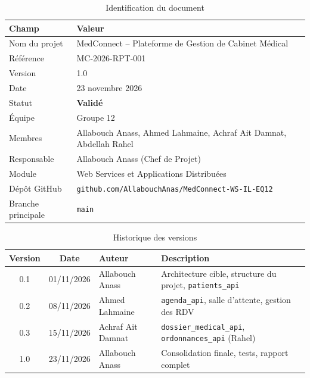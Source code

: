 \documentclass[12pt,a4paper]{report}
\begin{document}
\begin{table}[H]
\centering
\caption{Identification du document}
\begin{tabular}{|p{5cm}|p{9cm}|}
  \hline
  \rowcolor{medaccent}
  \textbf{Champ} & \textbf{Valeur} \\
  \hline
  Nom du projet & MedConnect -- Plateforme de Gestion de Cabinet Médical \\
  \hline
  Référence & MC-2026-RPT-001 \\
  \hline
  Version & 1.0 \\
  \hline
  Date & 23 novembre 2026 \\
  \hline
  Statut & \textcolor{medgreen}{\textbf{Validé}} \\
  \hline
  Équipe & Groupe 12 \\
  \hline
  Membres & Allabouch Anass, Ahmed Lahmaine, Achraf Ait Damnat, Abdellah Rahel \\
  \hline
  Responsable & Allabouch Anass (Chef de Projet) \\
  \hline
  Module & Web Services et Applications Distribuées \\
  \hline
  Dépôt GitHub & \texttt{github.com/AllabouchAnas/MedConnect-WS-IL-EQ12} \\
  \hline
  Branche principale & \texttt{main} \\
  \hline
\end{tabular}
\end{table}

\vspace{0.5cm}

\begin{table}[H]
\centering
\caption{Historique des versions}
\begin{tabular}{|c|c|p{3cm}|p{6cm}|}
  \hline
  \rowcolor{medaccent}
  \textbf{Version} & \textbf{Date} & \textbf{Auteur} & \textbf{Description} \\
  \hline
  0.1 & 01/11/2026 & Allabouch Anass & Architecture cible, structure du projet, \texttt{patients\_api} \\
  \hline
  0.2 & 08/11/2026 & Ahmed Lahmaine & \texttt{agenda\_api}, salle d'attente, gestion des RDV \\
  \hline
  0.3 & 15/11/2026 & Achraf Ait Damnat & \texttt{dossier\_medical\_api}, \texttt{ordonnances\_api} (Rahel) \\
  \hline
  1.0 & 23/11/2026 & Allabouch Anass & Consolidation finale, tests, rapport complet \\
  \hline
\end{tabular}
\end{table}
\end{document}

